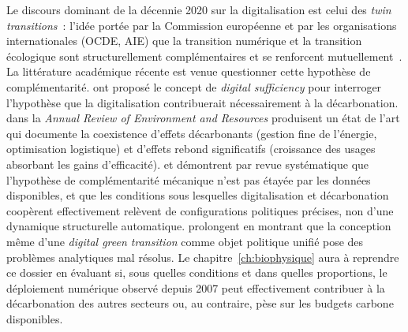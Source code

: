 %
Le discours dominant de la décennie 2020 sur la digitalisation est celui des \emph{twin transitions}~: l'idée portée par la Commission européenne et par les organisations internationales (OCDE, AIE) que la transition numérique et la transition écologique sont structurellement complémentaires et se renforcent mutuellement~\parencite{european_commission_twin_2022}. La littérature académique récente est venue questionner cette hypothèse de complémentarité. \textcite{santarius_digital_2022} ont proposé le concept de \emph{digital sufficiency} pour interroger l'hypothèse que la digitalisation contribuerait nécessairement à la décarbonation. \textcite{creutzig_digitalization_2022} dans la \emph{Annual Review of Environment and Resources} produisent un état de l'art qui documente la coexistence d'effets décarbonants (gestion fine de l'énergie, optimisation logistique) et d'effets rebond significatifs (croissance des usages absorbant les gains d'efficacité). \textcite{bennich_untangling_2025} et \textcite{mouthaan_systemic_2023} démontrent par revue systématique que l'hypothèse de complémentarité mécanique n'est pas étayée par les données disponibles, et que les conditions sous lesquelles digitalisation et décarbonation coopèrent effectivement relèvent de configurations politiques précises, non d'une dynamique structurelle automatique. \textcite{makitie_digital_2023} prolongent en montrant que la conception même d'une \emph{digital green transition} comme objet politique unifié pose des problèmes analytiques mal résolus. Le chapitre~\ref{ch:biophysique} aura à reprendre ce dossier en évaluant si, sous quelles conditions et dans quelles proportions, le déploiement numérique observé depuis 2007 peut effectivement contribuer à la décarbonation des autres secteurs ou, au contraire, pèse sur les budgets carbone disponibles.

